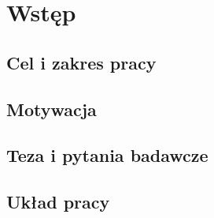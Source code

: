 \section*{Wstęp}
\label{sec:introduction}


\subsection*{Cel i zakres pracy}

\subsection*{Motywacja}

\subsection*{Teza i pytania badawcze}

\subsection*{Układ pracy}
